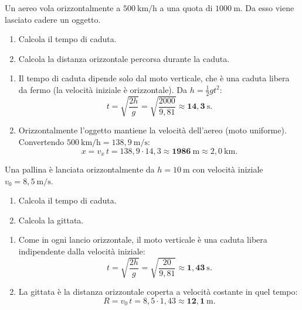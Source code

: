 \begin{question}[ID=1.2, subtitle={Caduta da aereo in volo orizzontale}, tags={moto parabolico, caduta libera}, difficulty=facile]
Un aereo vola orizzontalmente a $500\ \mathrm{km/h}$ a una quota di $1000\ \mathrm{m}$. Da esso viene lasciato cadere un oggetto.
\begin{enumerate}
\item Calcola il tempo di caduta.
\item Calcola la distanza orizzontale percorsa durante la caduta.
\end{enumerate}

\begin{solution}
\begin{enumerate}
\item Il tempo di caduta dipende solo dal moto verticale, che è una caduta libera da fermo (la velocità iniziale è orizzontale). Da $h = \tfrac{1}{2}gt^2$:
\[
t = \sqrt{\frac{2h}{g}} = \sqrt{\frac{2000}{9{,}81}} \approx \mathbf{14{,}3\ \mathrm{s}}.
\]
\item Orizzontalmente l'oggetto mantiene la velocità dell'aereo (moto uniforme). Convertendo $500\ \mathrm{km/h} = 138{,}9\ \mathrm{m/s}$:
\[
x = v_x\,t = 138{,}9\cdot 14{,}3 \approx \mathbf{1986\ \mathrm{m}} \approx 2{,}0\ \mathrm{km}.
\]
\end{enumerate}
\end{solution}
\end{question}


\begin{question}[ID=1.3, subtitle={Lancio orizzontale da 10 m di altezza}, tags={moto parabolico, lancio orizzontale}, difficulty=facile]
Una pallina è lanciata orizzontalmente da $h = 10\ \mathrm{m}$ con velocità iniziale $v_0 = 8{,}5\ \mathrm{m/s}$.
\begin{enumerate}
\item Calcola il tempo di caduta.
\item Calcola la gittata.
\end{enumerate}

\begin{solution}
\begin{enumerate}
\item Come in ogni lancio orizzontale, il moto verticale è una caduta libera indipendente dalla velocità iniziale:
\[
t = \sqrt{\frac{2h}{g}} = \sqrt{\frac{20}{9{,}81}} \approx \mathbf{1{,}43\ \mathrm{s}}.
\]
\item La gittata è la distanza orizzontale coperta a velocità costante in quel tempo:
\[
R = v_0\,t = 8{,}5\cdot 1{,}43 \approx \mathbf{12{,}1\ \mathrm{m}}.
\]
\end{enumerate}
\end{solution}
\end{question}

